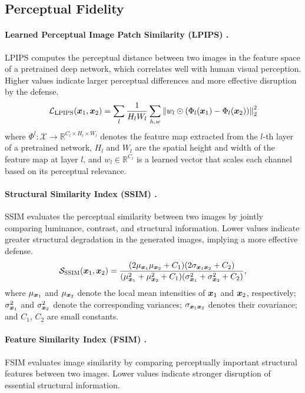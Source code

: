 \documentclass{article}
\begin{document}
\subsection{Perceptual Fidelity}
\paragraph{Learned Perceptual Image Patch Similarity (LPIPS) .}
LPIPS computes the perceptual distance between two images in the feature space of a pretrained deep network, which correlates well with human visual perception. Higher values indicate larger perceptual differences and more effective disruption by the defense.
\begin{equation}
{\mathcal{L}}_\mathrm{LPIPS}({\bm{x}}_1, {\bm{x}}_2) = \sum_{l} \frac{1}{H_l W_l} \sum_{h,w} \left\|  w_l \odot (\Phi_l({\bm{x}}_1) - \Phi_l({\bm{x}}_2)) \right\|_2^2
\label{eq:lpips}
\end{equation}
\noindent where $\Phi^l: \mathcal{X} \rightarrow \mathbb{R}^{C_l \times H_l \times W_l}$ denotes the feature map extracted from the $l$-th layer of a pretrained network, $H_l$ and $W_l$ are the spatial height and width of the feature map at layer $l$, and $w_l \in \mathbb{R}^{C_l}$ is a learned vector that scales each channel based on its perceptual relevance. 

\paragraph{Structural Similarity Index (SSIM) .}
SSIM evaluates the perceptual similarity between two images by jointly comparing luminance, contrast, and structural information. Lower values indicate greater structural degradation in the generated images, implying a more effective defense.
\begin{equation}
{\mathcal{S}}_\mathrm{SSIM}({\bm{x}}_1, {\bm{x}}_2) = \frac{ (2\mu_{{\bm{x}}_1}\mu_{{\bm{x}}_2}+C_1)
(2\sigma_{{\bm{x}}_1{\bm{x}}_2}+C_2)}{(\mu_{{\bm{x}}_1}^2+\mu_{{\bm{x}}_2}^2+C_1)
(\sigma_{{\bm{x}}_1}^2+\sigma_{{\bm{x}}_2}^2+C_2)},
\label{eq:ssim}
\end{equation}
\noindent where $\mu_{{\bm{x}}_1}$ and $\mu_{{\bm{x}}_2}$ denote the local mean intensities of ${\bm{x}}_1$ and ${\bm{x}}_2$, respectively; $\sigma_{{\bm{x}}_1}^2$ and $\sigma_{{\bm{x}}_2}^2$ denote the corresponding variances; $\sigma_{{\bm{x}}_1{\bm{x}}_2}$ denotes their covariance; and $C_1$, $C_2$ are small constants.

\paragraph{Feature Similarity Index (FSIM) .}
FSIM evaluates image similarity by comparing perceptually important structural features between two images. Lower values indicate stronger disruption of essential structural information.
\end{document}
